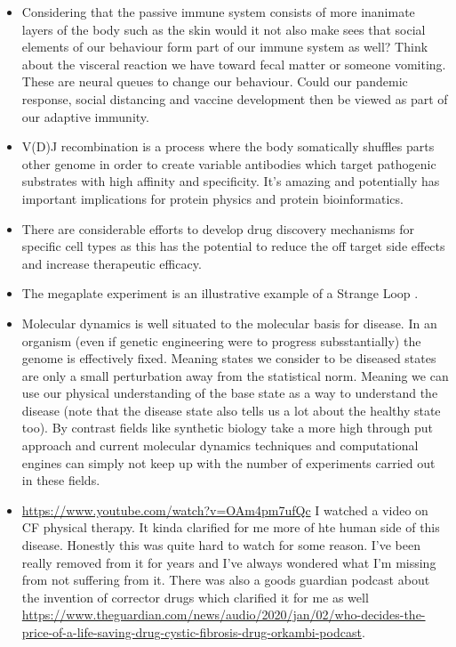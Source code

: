\begin{itemize}
\item Considering that the passive immune system consists of more inanimate layers of the body such as the skin would it not also make sees that social elements of our behaviour form part of our immune system as well? Think about the visceral reaction we have toward fecal matter or someone vomiting. These are neural queues to change our behaviour. Could our pandemic response, social distancing and vaccine development then be viewed as part of our adaptive immunity. 

\item V(D)J recombination is a process where the body somatically shuffles parts other genome in order to create variable antibodies which target pathogenic substrates with high affinity and specificity. It's amazing and potentially has important implications for protein physics and protein bioinformatics.

\item There are considerable efforts to develop drug discovery mechanisms for specific cell types \cite{yu2020} as this has the potential to reduce the off target side effects and increase therapeutic efficacy. 

\item The megaplate experiment\cite{baym2016} is an illustrative example of a Strange Loop \cite{hofstadter2007}. 

\item Molecular dynamics is well situated to the molecular basis for disease. In an organism (even if genetic engineering were to progress subsstantially) the genome is effectively fixed. Meaning states we consider to be diseased states are only a small perturbation away from the statistical norm. Meaning we can use our physical understanding of the base state as a way to understand the disease (note that the disease state also tells us a lot about the healthy state too). By contrast fields like synthetic biology take a more high through put approach and current molecular dynamics techniques and computational engines can simply not keep up with the number of experiments carried out in these fields.  

\item \href{https://www.youtube.com/watch?v=OAm4pm7ufQc}{https://www.youtube.com/watch?v=OAm4pm7ufQc} I watched a video on CF physical therapy. It kinda clarified for me more of hte human side of this disease. Honestly this was quite hard to watch for some reason. I've been really removed from it for years and I've always wondered what I'm missing from not suffering from it. There was also a goods guardian podcast about the invention of corrector drugs which clarified it for me as well \href{https://www.theguardian.com/news/audio/2020/jan/02/who-decides-the-price-of-a-life-saving-drug-cystic-fibrosis-drug-orkambi-podcast}{https://www.theguardian.com/news/audio/2020/jan/02/who-decides-the-price-of-a-life-saving-drug-cystic-fibrosis-drug-orkambi-podcast}.
\end{itemize}
